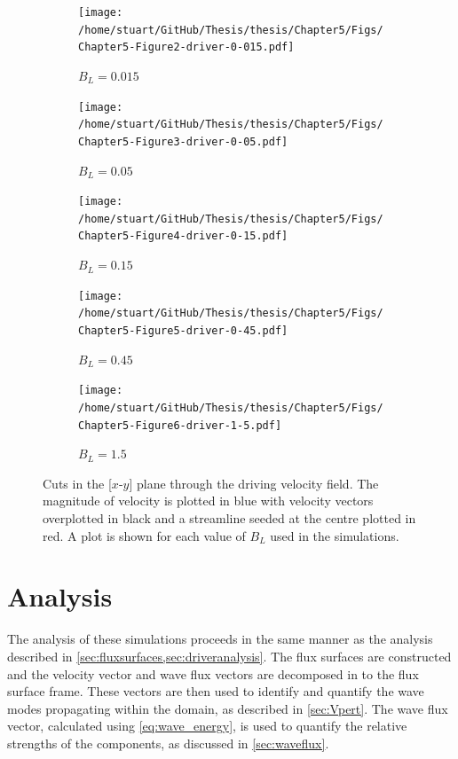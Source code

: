 \documentclass[a4paper,12pt,fourier,authoryear,custommargin]{Classes/PhDThesisPSnPDF}
\begin{document}
\begin{figure}
    \centering


    \begin{subfigure}[b]{0.495\columnwidth}
        \texttt{[image: /home/stuart/GitHub/Thesis/thesis/Chapter5/Figs/Chapter5-Figure2-driver-0-015.pdf]}
        \caption{$B_L = 0.015$}
        \label{fig:driver-0-015}
    \end{subfigure}
    \begin{subfigure}[b]{0.495\columnwidth}
        \texttt{[image: /home/stuart/GitHub/Thesis/thesis/Chapter5/Figs/Chapter5-Figure3-driver-0-05.pdf]}
        \caption{$B_L = 0.05$}
        \label{fig:driver-0-05}
    \end{subfigure}

    \begin{subfigure}[b]{0.495\columnwidth}
        \texttt{[image: /home/stuart/GitHub/Thesis/thesis/Chapter5/Figs/Chapter5-Figure4-driver-0-15.pdf]}
        \caption{$B_L = 0.15$}
        \label{fig:driver-0-15}
    \end{subfigure}
    \begin{subfigure}[b]{0.495\columnwidth}
        \texttt{[image: /home/stuart/GitHub/Thesis/thesis/Chapter5/Figs/Chapter5-Figure5-driver-0-45.pdf]}
        \caption{$B_L = 0.45$}
        \label{fig:driver-0-45}
    \end{subfigure}

    \begin{subfigure}[b]{0.495\columnwidth}
        \texttt{[image: /home/stuart/GitHub/Thesis/thesis/Chapter5/Figs/Chapter5-Figure6-driver-1-5.pdf]}
        \caption{$B_L = 1.5$}
        \label{fig:driver-1-5}
    \end{subfigure}
    \caption{Cuts in the [$x$-$y$] plane through the driving velocity field. The magnitude of velocity is plotted in blue with velocity vectors overplotted in black and a streamline seeded at the centre plotted in red. A plot is shown for each value of $B_L$ used in the simulations.}
    \label{fig:All_log_spirals}
\end{figure}

\section{Analysis}\label{sec:analysis}

The analysis of these simulations proceeds in the same manner as the analysis described in \cref{sec:fluxsurfaces,sec:driveranalysis}.
The flux surfaces are constructed and the velocity vector and wave flux vectors are decomposed in to the flux surface frame.
These vectors are then used to identify and quantify the wave modes propagating within the domain, as described in \cref{sec:Vpert}.
The wave flux vector, calculated using \cref{eq:wave_energy}, is used to quantify the relative strengths of the components, as discussed in \cref{sec:waveflux}.
\end{document}
